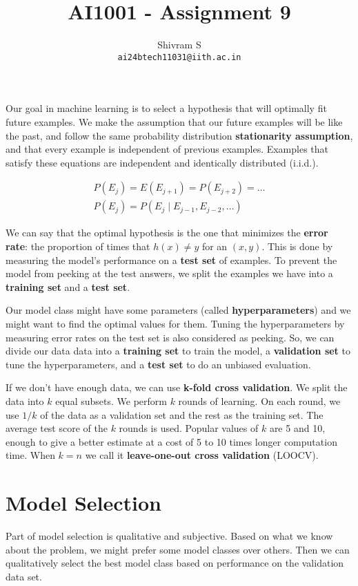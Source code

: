 \documentclass{article}
\author{Shivram S \\ \texttt{ai24btech11031@iith.ac.in}}
\title{AI1001 - Assignment 9}
\begin{document}
\maketitle

Our goal in machine learning is to select a hypothesis that will
optimally fit future examples. We make the assumption that our 
future examples will be like the past, and follow the same probability
distribution \textbf{stationarity assumption}, and that every example
is independent of previous examples. Examples that satisfy these
equations are independent and identically distributed (i.i.d.).

\begin{eqnarray*}    
P(E_j) = E(E_{j+1}) = P(E_{j+2}) = \dots \\
P(E_j) = P(E_j \mid E_{j-1}, E_{j-2}, \dots)
\end{eqnarray*}

We can say that the optimal hypothesis is the one that minimizes the
\textbf{error rate}: the proportion of times that $h(x) \ne y$ for an
$(x,y)$. This is done by measuring the model's performance on a
\textbf{test set} of examples. To prevent the model from peeking at the
test answers, we split the examples we have into a \textbf{training set}
and a \textbf{test set}.

Our model class might have some parameters (called \textbf{hyperparameters})
and we might want to find the optimal values for them. Tuning the 
hyperparameters by measuring error rates on the test set is also considered as peeking.
So, we can divide our data data into a \textbf{training set} to train the
model, a \textbf{validation set} to tune the hyperparameters, and a
\textbf{test set} to do an unbiased evaluation.

If we don't have enough data, we can use \textbf{k-fold cross validation}.
We split the data into $k$ equal subsets. We perform $k$ rounds of
learning. On each round, we use $1/k$ of the data as a validation set
and the rest as the training set. The average test score of the
$k$ rounds is used. Popular values of $k$ are 5 and 10, enough to
give a better estimate at a cost of 5 to 10 times longer computation
time. When $k=n$ we call it \textbf{leave-one-out cross validation} (LOOCV).

\section{Model Selection}

Part of model selection is qualitative and subjective. Based on what
we know about the problem, we might prefer some model classes over others.
Then we can qualitatively select the best model class based on
performance on the validation data set.
\end{document}
